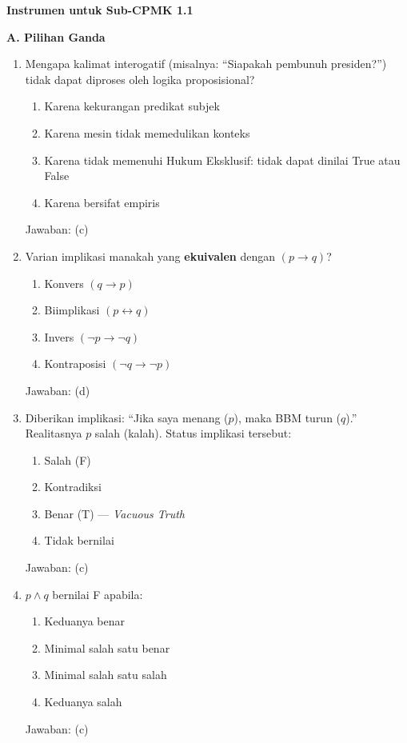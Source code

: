 \documentclass[../main]{subfiles}
\begin{document}
\begin{asesmen}
\textbf{Instrumen untuk Sub-CPMK 1.1}

\textbf{A. Pilihan Ganda}

\begin{enumerate}
  \item Mengapa kalimat interogatif (misalnya: ``Siapakah pembunuh presiden?'') tidak dapat diproses oleh logika proposisional?
  \begin{enumerate}
    \item Karena kekurangan predikat subjek
    \item Karena mesin tidak memedulikan konteks
    \item Karena tidak memenuhi Hukum Eksklusif: tidak dapat dinilai True atau False
    \item Karena bersifat empiris
  \end{enumerate}
  Jawaban: (c)

  \item Varian implikasi manakah yang \textbf{ekuivalen} dengan $(p \rightarrow q)$?
  \begin{enumerate}
    \item Konvers $(q \rightarrow p)$
    \item Biimplikasi $(p \leftrightarrow q)$
    \item Invers $(\neg p \rightarrow \neg q)$
    \item Kontraposisi $(\neg q \rightarrow \neg p)$
  \end{enumerate}
  Jawaban: (d)

  \item Diberikan implikasi: ``Jika saya menang ($p$), maka BBM turun ($q$).'' Realitasnya $p$ salah (kalah). Status implikasi tersebut:
  \begin{enumerate}
    \item Salah (F)
    \item Kontradiksi
    \item Benar (T) --- \textit{Vacuous Truth}
    \item Tidak bernilai
  \end{enumerate}
  Jawaban: (c)

  \item $p \wedge q$ bernilai F apabila:
  \begin{enumerate}
    \item Keduanya benar
    \item Minimal salah satu benar
    \item Minimal salah satu salah
    \item Keduanya salah
  \end{enumerate}
  Jawaban: (c)


\end{enumerate}
\end{asesmen}
\end{document}
